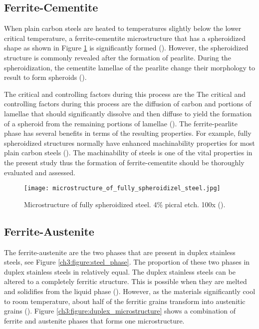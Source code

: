 \subsection{Ferrite-Cementite}
When plain carbon steels are heated to temperatures slightly below the lower critical temperature, a ferrite-cementite microstructure that has a spheroidized shape as shown in Figure \ref{ch3:figure:spheroidized_steel} is significantly formed (\cite{molabe2018determining}). However, the spheroidized structure is commonly revealed after the formation of pearlite. During the spheroidization, the cementite lamellae of the pearlite change their morphology to result to form spheroids (\cite{molabe2018determining}).

The critical and controlling factors during this process are the The critical and controlling factors during this process are the diffusion of carbon and portions of lamellae that should significantly dissolve and then diffuse to yield the formation of a spheroid from the remaining portions of lamellae (\cite{molabe2018determining}). The ferrite-pearlite phase has several benefits in terms of the resulting properties. For example, fully spheroidized structures normally have enhanced machinability properties for most plain carbon steels (\cite{molabe2018determining}).  The machinability of steels is one of the vital properties in the present study thus the formation of ferrite-cementite should be thoroughly evaluated and assessed.

\begin{figure}[H]
    \centering
    \texttt{[image: microstructure\_of\_fully\_spheroidizel\_steel.jpg]}
    \caption{Microstructure of fully spheroidized steel. 4\% picral etch. 100x (\cite{molabe2018determining}).}
    \label{ch3:figure:spheroidized_steel}
\end{figure}

\subsection{Ferrite-Austenite}
The ferrite-austenite are the two phases that are present in duplex stainless steels, see Figure \ref{ch3:figure:steel_phase}. The proportion of these two phases in duplex stainless steels in relatively equal. The duplex stainless steels can be altered to a completely ferritic structure. This is possible when they are melted and solidifies from the liquid phase (\cite{xiao2006challenge}).  However, as the materials significantly cool to room temperature, about half of the ferritic grains transform into austenitic grains (\cite{davison1991guide}). Figure \ref{ch3:figure:duplex_microstructure} shows a combination of ferrite and austenite phases that forms one microstructure.

